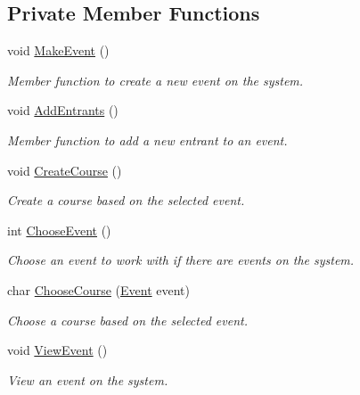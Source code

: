 \subsection*{\-Private \-Member \-Functions}
\begin{DoxyCompactItemize}
\item 
void \hyperlink{classEventCreator_aff7cf249a91689145b26b8fc7d24f7a3}{\-Make\-Event} ()
\begin{DoxyCompactList}\small\item\em \-Member function to create a new event on the system. \end{DoxyCompactList}\item 
void \hyperlink{classEventCreator_a20a2c56081e4c3276cc5ec1f2ef11da6}{\-Add\-Entrants} ()
\begin{DoxyCompactList}\small\item\em \-Member function to add a new entrant to an event. \end{DoxyCompactList}\item 
void \hyperlink{classEventCreator_ac138263790915b9ada256dd1f1c1db35}{\-Create\-Course} ()
\begin{DoxyCompactList}\small\item\em \-Create a course based on the selected event. \end{DoxyCompactList}\item 
int \hyperlink{classEventCreator_acc29745a2fa8cb4fdac938f26619123a}{\-Choose\-Event} ()
\begin{DoxyCompactList}\small\item\em \-Choose an event to work with if there are events on the system. \end{DoxyCompactList}\item 
char \hyperlink{classEventCreator_aee16394ee17f9e82879f271deda9fc41}{\-Choose\-Course} (\hyperlink{classEvent}{\-Event} event)
\begin{DoxyCompactList}\small\item\em \-Choose a course based on the selected event. \end{DoxyCompactList}\item 
void \hyperlink{classEventCreator_afa09813d8fdef9ae0bbdfbff00645d9b}{\-View\-Event} ()
\begin{DoxyCompactList}\small\item\em \-View an event on the system. \end{DoxyCompactList}\end{DoxyCompactItemize}
